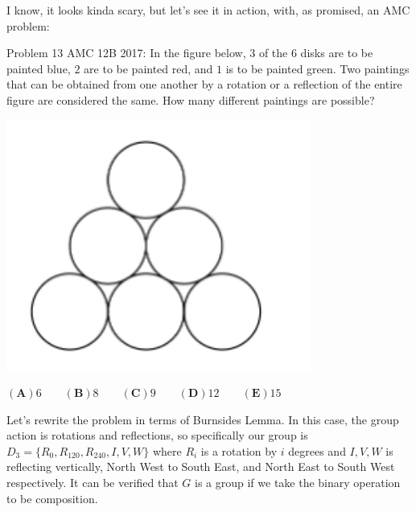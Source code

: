 \documentclass{article}
\begin{document}
I know, it looks kinda scary, but let's see it in action, with, as promised, an AMC problem:

Problem 13 AMC 12B 2017:
In the figure below, $3$ of the $6$ disks are to be painted blue, $2$ are to be painted red, and $1$ is to be painted green. Two paintings that can be obtained from one another by a rotation or a reflection of the entire figure are considered the same. How many different paintings are possible?
\begin{center}
    \includegraphics[width=10cm, scale=1.5]{images/amc12b1017p13.png}
\end{center}

$\mathbf{(A) } 6 \qquad \mathbf{(B) } 8 \qquad \mathbf{(C) } 9 \qquad \mathbf{(D) } 12 \qquad \mathbf{(E) } 15$

Let's rewrite the problem in terms of Burnsides Lemma. In this case, the group action is rotations and reflections, so specifically our group is $D_3=\{R_0,R_{120},R_{240}, I,V,W\}$ where $R_i$ is a rotation by $i$ degrees and $I, V, W$ is reflecting vertically, North West to South East, and North East to South West respectively. It can be verified that $G$ is a group if we take the binary operation to be composition.
\end{document}
